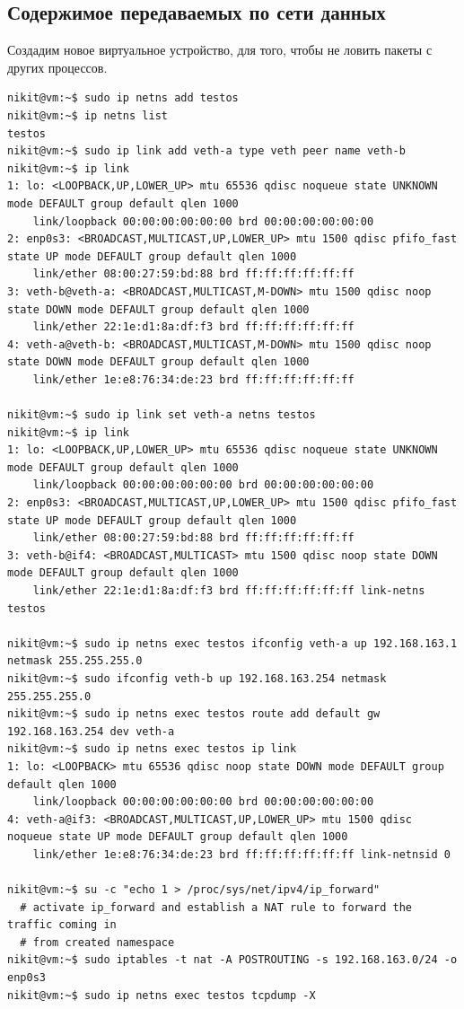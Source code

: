 \documentclass[11pt, a4paper]{article}
\begin{document}
\subsection{Содержимое передаваемых по сети данных}
Создадим новое виртуальное устройство, для того, чтобы не ловить пакеты с других процессов.
\begin{Verbatim}[fontsize=\small]
nikit@vm:~$ sudo ip netns add testos
nikit@vm:~$ ip netns list
testos
nikit@vm:~$ sudo ip link add veth-a type veth peer name veth-b
nikit@vm:~$ ip link
1: lo: <LOOPBACK,UP,LOWER_UP> mtu 65536 qdisc noqueue state UNKNOWN mode DEFAULT group default qlen 1000
    link/loopback 00:00:00:00:00:00 brd 00:00:00:00:00:00
2: enp0s3: <BROADCAST,MULTICAST,UP,LOWER_UP> mtu 1500 qdisc pfifo_fast state UP mode DEFAULT group default qlen 1000
    link/ether 08:00:27:59:bd:88 brd ff:ff:ff:ff:ff:ff
3: veth-b@veth-a: <BROADCAST,MULTICAST,M-DOWN> mtu 1500 qdisc noop state DOWN mode DEFAULT group default qlen 1000
    link/ether 22:1e:d1:8a:df:f3 brd ff:ff:ff:ff:ff:ff
4: veth-a@veth-b: <BROADCAST,MULTICAST,M-DOWN> mtu 1500 qdisc noop state DOWN mode DEFAULT group default qlen 1000
    link/ether 1e:e8:76:34:de:23 brd ff:ff:ff:ff:ff:ff

nikit@vm:~$ sudo ip link set veth-a netns testos
nikit@vm:~$ ip link
1: lo: <LOOPBACK,UP,LOWER_UP> mtu 65536 qdisc noqueue state UNKNOWN mode DEFAULT group default qlen 1000
    link/loopback 00:00:00:00:00:00 brd 00:00:00:00:00:00
2: enp0s3: <BROADCAST,MULTICAST,UP,LOWER_UP> mtu 1500 qdisc pfifo_fast state UP mode DEFAULT group default qlen 1000
    link/ether 08:00:27:59:bd:88 brd ff:ff:ff:ff:ff:ff
3: veth-b@if4: <BROADCAST,MULTICAST> mtu 1500 qdisc noop state DOWN mode DEFAULT group default qlen 1000
    link/ether 22:1e:d1:8a:df:f3 brd ff:ff:ff:ff:ff:ff link-netns testos

nikit@vm:~$ sudo ip netns exec testos ifconfig veth-a up 192.168.163.1 netmask 255.255.255.0
nikit@vm:~$ sudo ifconfig veth-b up 192.168.163.254 netmask 255.255.255.0
nikit@vm:~$ sudo ip netns exec testos route add default gw 192.168.163.254 dev veth-a
nikit@vm:~$ sudo ip netns exec testos ip link
1: lo: <LOOPBACK> mtu 65536 qdisc noop state DOWN mode DEFAULT group default qlen 1000
    link/loopback 00:00:00:00:00:00 brd 00:00:00:00:00:00
4: veth-a@if3: <BROADCAST,MULTICAST,UP,LOWER_UP> mtu 1500 qdisc noqueue state UP mode DEFAULT group default qlen 1000
    link/ether 1e:e8:76:34:de:23 brd ff:ff:ff:ff:ff:ff link-netnsid 0

nikit@vm:~$ su -c "echo 1 > /proc/sys/net/ipv4/ip_forward"
  # activate ip_forward and establish a NAT rule to forward the traffic coming in
  # from created namespace 
nikit@vm:~$ sudo iptables -t nat -A POSTROUTING -s 192.168.163.0/24 -o enp0s3
nikit@vm:~$ sudo ip netns exec testos tcpdump -X
\end{Verbatim}
\end{document}
